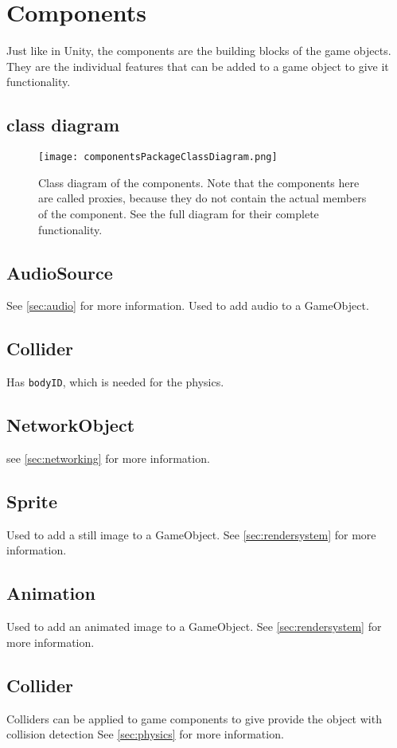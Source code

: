 \section{Components}
\label{sec:components}
Just like in Unity, the components are the building blocks of the game objects.
They are the individual features that can be added to a game object to give it functionality.

\subsection{class diagram}
\begin{figure}[H]
    \texttt{[image: componentsPackageClassDiagram.png]}
    \caption{Class diagram of the components. Note that the components here are called proxies, because they do not contain the actual members of the component. See the full diagram for their complete functionality.}
    \label{fig:components}
\end{figure}

\subsection{AudioSource}
See \autoref{sec:audio} for more information.
Used to add audio to a GameObject.

\subsection{Collider}
Has \texttt{bodyID}, which is needed for the physics.

\subsection{NetworkObject}
see \autoref{sec:networking} for more information.

\subsection{Sprite}
Used to add a still image to a GameObject.
See \autoref{sec:rendersystem} for more information.

\subsection{Animation}
Used to add an animated image to a GameObject.
See \autoref{sec:rendersystem} for more information.

\subsection{Collider}
 Colliders can be applied to game components to give provide the object with collision detection
See \autoref{sec:physics} for more information.
